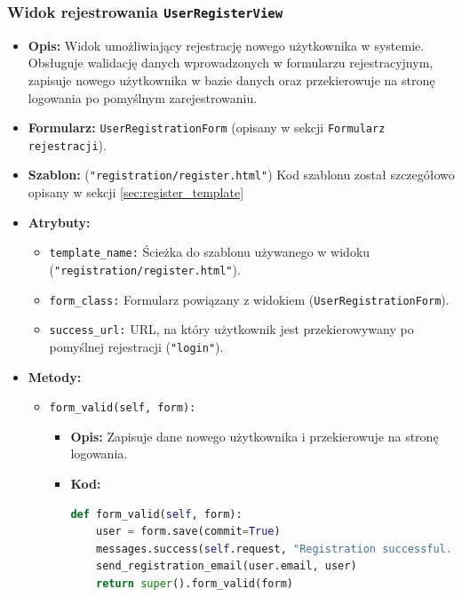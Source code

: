 \documentclass[12pt,a4paper,oneside]{article}
\theoremstyle{definition}
\numberwithin{equation}{section}
\begin{document}
\subsubsection*{Widok rejestrowania \texttt{UserRegisterView}}
\begin{itemize}
    \item \textbf{Opis:}
        Widok umożliwiający rejestrację nowego użytkownika w systemie. Obsługuje walidację danych wprowadzonych w formularzu rejestracyjnym, zapisuje nowego użytkownika w bazie danych oraz przekierowuje na stronę logowania po pomyślnym zarejestrowaniu.
    \item \textbf{Formularz:} 
        \texttt{UserRegistrationForm} (opisany w sekcji \texttt{Formularz rejestracji}).
    \item \textbf{Szablon:} 
        (\texttt{"registration/register.html"})
        \subsubitem Kod szablonu został szczegółowo opisany w sekcji \ref{sec:register_template}
    \item \textbf{Atrybuty:}
        \begin{itemize}
            \item \texttt{template\_name:} Ścieżka do szablonu używanego w widoku (\texttt{"registration/register.html"}).
            \item \texttt{form\_class:} Formularz powiązany z widokiem (\texttt{UserRegistrationForm}).
            \item \texttt{success\_url:} URL, na który użytkownik jest przekierowywany po pomyślnej rejestracji (\texttt{"login"}).
        \end{itemize}
    \item \textbf{Metody:}
        \begin{itemize}
            \item \texttt{form\_valid(self, form):}
                \begin{itemize}
                    \item \textbf{Opis:} Zapisuje dane nowego użytkownika i przekierowuje na stronę logowania.
                    \item \textbf{Kod:}
                    \begin{lstlisting}[language=Python, caption=Metoda form\_valid w UserRegisterView]
def form_valid(self, form):
    user = form.save(commit=True)
    messages.success(self.request, "Registration successful. Please log in.")
    send_registration_email(user.email, user)
    return super().form_valid(form)
                    \end{lstlisting}
                \end{itemize}
        \end{itemize}
\end{itemize}
\end{document}
